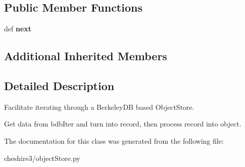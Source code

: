\subsection*{Public Member Functions}
\begin{DoxyCompactItemize}
\item 
\hypertarget{classcheshire3_1_1object_store_1_1_bdb_object_iter_a7ea4437a8a137350cb1a98d5fe1ccb50}{def {\bfseries next}}\label{classcheshire3_1_1object_store_1_1_bdb_object_iter_a7ea4437a8a137350cb1a98d5fe1ccb50}

\end{DoxyCompactItemize}
\subsection*{Additional Inherited Members}


\subsection{Detailed Description}
\begin{DoxyVerb}Facilitate iterating through a BerkeleyDB based ObjectStore.

Get data from bdbIter and turn into record, then process record into
object.
\end{DoxyVerb}
 

The documentation for this class was generated from the following file\-:\begin{DoxyCompactItemize}
\item 
cheshire3/object\-Store.\-py\end{DoxyCompactItemize}
